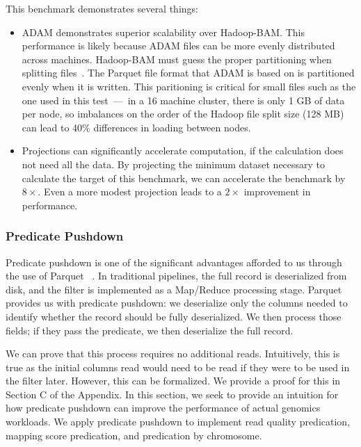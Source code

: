 \documentclass[10pt,twocolumn]{article}
\theoremstyle{plain}
\begin{document}
This benchmark demonstrates several things:

\begin{itemize}
\item ADAM demonstrates superior scalability over Hadoop-BAM. This performance is likely because ADAM files can be more evenly distributed across machines.
Hadoop-BAM must guess the proper partitioning when splitting files~\cite{niemenmaa12}. The Parquet file format that ADAM is based on is partitioned
evenly when it is written\cite{parquet}. This paritioning is critical for small files such as the one used in this test~---~in a 16 machine cluster, there is only 1 GB of
data per node, so imbalances on the order of the Hadoop file split size (128 MB) can lead to 40\% differences in loading between nodes.
\item Projections can significantly accelerate computation, if the calculation does not need all the data. By projecting the minimum dataset necessary
to calculate the target of this benchmark, we can accelerate the benchmark by $8\times$. Even a more modest projection leads to a $2\times$
improvement in performance.
\end{itemize}

\subsubsection{Predicate Pushdown}
\label{sec:predicate-pushdown}

Predicate pushdown is one of the significant advantages afforded to us through the use of Parquet	~\cite{parquet}. In traditional
pipelines, the full record is deserialized from disk, and the filter is implemented as a Map/Reduce processing stage. Parquet provides
us with predicate pushdown: we deserialize only the columns needed to identify whether the record should be fully deserialized. We
then process those fields; if they pass the predicate, we then deserialize the full record.

We can prove that this process requires no additional reads. Intuitively, this is true as the initial columns read would need to be read
if they were to be used in the filter later. However, this can be formalized. We provide a proof for this in Section C of the Appendix.
In this section, we seek to provide an intuition for how predicate pushdown can improve the performance of actual genomics workloads.
We apply predicate pushdown to implement read quality predication, mapping score predication, and predication by chromosome. 
\end{document}

